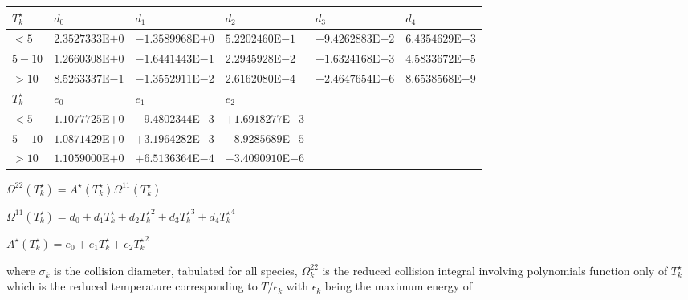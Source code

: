 \documentclass{warpdoc}
\renewcommand{\fontsizetable}{\footnotesize\scalefont{1.0}}
\begin{document}
\begin{table*}[t]
\fontsizetable
\begin{center}
  \begin{threeparttable}
    \fontsizetable
    \begin{tabular*}{\textwidth}{@{\extracolsep{\fill}}llllll}
      \toprule
$T^\star_k$& $d_0$          & $d_1$           & $d_2$          & $d_3$           & $d_4$ \\
\midrule
$<5$       & $2.3527333$E$+0$ & $-1.3589968$E$+0$ & $5.2202460$E$-1$ & $-9.4262883$E$-2$ & $6.4354629$E$-3$ \\
$5-10$     & $1.2660308$E$+0$ & $-1.6441443$E$-1$ & $2.2945928$E$-2$ & $-1.6324168$E$-3$ & $4.5833672$E$-5$ \\
$>10$      & $8.5263337$E$-1$ & $-1.3552911$E$-2$ & $2.6162080$E$-4$ & $-2.4647654$E$-6$ & $8.6538568$E$-9$ \\
\midrule
$T^\star_k$& $e_0$          & $e_1$           & $e_2$           &~&~\\
\midrule
$<5$       & $1.1077725$E$+0$ & $-9.4802344$E$-3$ & $+1.6918277$E$-3$ &~&~ \\
$5-10$     & $1.0871429$E$+0$ & $+3.1964282$E$-3$ & $-8.9285689$E$-5$ &~& ~\\
$>10$      & $1.1059000$E$+0$ & $+6.5136364$E$-4$ & $-3.4090910$E$-6$ &~&~ \\
      \bottomrule
    \end{tabular*}
    \label{table:species-Omega}
    \begin{tablenotes}
      \item  $\Omega^{22}(T^\star_k)= A^\star (T^\star_k) \Omega^{11}(T^\star_k)$ 
      \item  $\Omega^{11}(T^\star_k)=d_0+d_1 {T^\star_k}+d_2 {T^\star_k}^2+d_3 {T^\star_k}^3+d_4 {T^\star_k}^4$ 
      \item  $A^\star (T^\star_k)=e_0+e_1 {T^\star_k}+e_2 {T^\star_k}^2$ 
    \end{tablenotes}
  \end{threeparttable}
\end{center}
\end{table*}
%
where $\sigma_k$ is the collision diameter, tabulated for all species,
$\Omega^{22}_k$ is the reduced
collision integral involving polynomials function only of
$T^\star_k$
which is the reduced temperature corresponding to
$T/ \epsilon_k$ with $\epsilon_k$ being the maximum energy of
\end{document}
